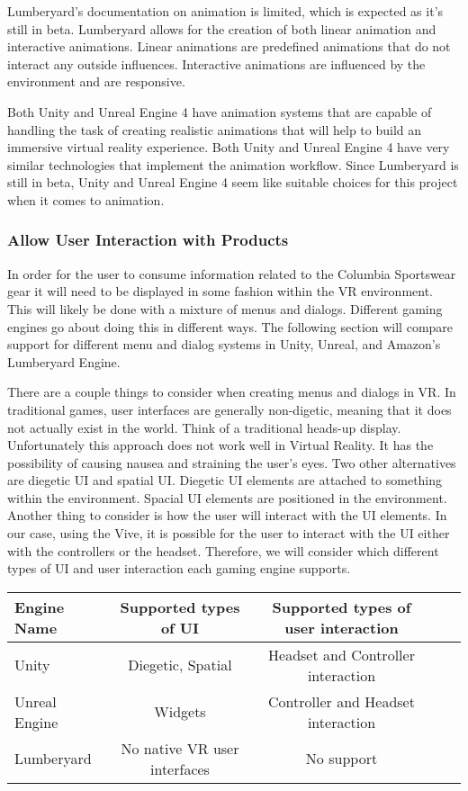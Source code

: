 \documentclass[10pt,journal,compsoc,onecolumn, draftclsnofoot]{IEEEtran}
\begin{document}
\begin{bibunit}
Lumberyard's documentation on animation is limited, which is expected as it's still in beta. Lumberyard allows for the creation of both linear animation and interactive animations. Linear animations are predefined animations that do not interact any outside influences. Interactive animations are influenced by the environment and are responsive\cite{lumberyard_animation}.

Both Unity and Unreal Engine 4 have animation systems that are capable of handling the task of creating realistic animations that will help to build an immersive virtual reality experience. Both Unity and Unreal Engine 4 have very similar technologies that implement the animation workflow. Since Lumberyard is still in beta, Unity and Unreal Engine 4 seem like suitable choices for this project when it comes to animation.

\subsubsection{Allow User Interaction with Products}
In order for the user to consume information related to the Columbia Sportswear gear it will need to be displayed in some fashion within the VR environment.
This will likely be done with a mixture of menus and dialogs.
Different gaming engines go about doing this in different ways.
The following section will compare support for different menu and dialog systems in Unity, Unreal, and Amazon's Lumberyard Engine.

There are a couple things to consider when creating menus and dialogs in VR.
In traditional games, user interfaces are generally non-digetic, meaning that it does not actually exist in the world.
Think of a traditional heads-up display.
Unfortunately this approach does not work well in Virtual Reality.
It has the possibility of causing nausea and straining the user's eyes.
Two other alternatives are diegetic UI and spatial UI.
Diegetic UI elements are attached to something within the environment.
Spacial UI elements are positioned in the environment.
Another thing to consider is how the user will interact with the UI elements.
In our case, using the Vive, it is possible for the user to interact with the UI either with the controllers or the headset.
Therefore, we will consider which different types of UI and user interaction each gaming engine supports.

\vspace{2mm}
\begin{table}[h!]
\centering
  \begin{tabular}{ | l || c | c | c | c |  }
  \hline
  Engine Name & Supported types of UI & Supported types of user interaction \\
  \hline
  Unity & Diegetic, Spatial &  Headset and Controller interaction\\ \hline
  Unreal Engine & Widgets & Controller and Headset interaction\\ \hline
  Lumberyard & No native VR user interfaces & No support\\ \hline
  \end{tabular}
\end{table}
\vspace{2mm}


\end{bibunit}
\end{document}
